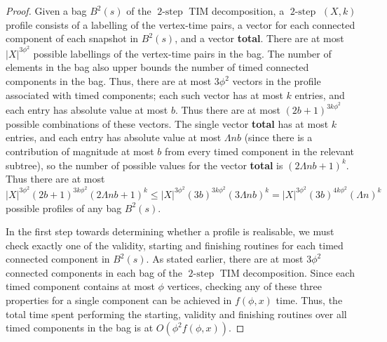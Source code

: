\documentclass[a4paper,UKenglish,cleveref, autoref, thm-restate]{lipics-v2021} %
\DeclareMathOperator{\twostep}{2-step}
\begin{document}
\begin{proof}
    Given a bag $B^2(s)$ of the $\twostep$ TIM decomposition, a $\twostep$ $(X,k)$ profile consists of a labelling of the vertex-time pairs, a vector for each connected component of each snapshot in $B^2(s)$, and a vector \textbf{total}. There are at most $|X|^{3\phi^2}$ possible labellings of the vertex-time pairs in the bag. The number of elements in the bag also upper bounds the number of timed connected components in the bag. Thus, there are at most $3\phi^2$ vectors in the profile associated with timed components; each such vector has at most $k$ entries, and each entry has absolute value at most $b$.  Thus there are at most $(2b+1)^{3k\phi^2}$ possible combinations of these vectors.  The single vector \textbf{total} has at most $k$ entries, and each entry has absolute value at most $\Lambda n b$ (since there is a contribution of magnitude at most $b$ from every timed component in the relevant subtree), so the number of possible values for the vector \textbf{total} is $(2 \Lambda n b + 1)^k$.  Thus there are at most $|X|^{3 \phi^2} (2b+1)^{3k\phi^2} (2 \Lambda n b + 1)^k\leq |X|^{3 \phi^2}(3b)^{3k \phi^2}(3 \Lambda n b)^k = |X|^{3 \phi^2} (3b)^{4 k \phi^2} (\Lambda n)^k$ possible profiles of any bag $B^2(s)$.


    
    
    In the first step towards determining whether a profile is realisable, we must check exactly one of the validity, starting and finishing routines for each timed connected component in $B^2(s)$.  As stated earlier, there are at most $3\phi^2$ connected components in each bag of the $\twostep$ TIM decomposition. %
    Since each timed component contains at most $\phi$ vertices, checking any of these three properties for a single component can be achieved in $f(\phi,x)$ time. Thus, the total time spent performing the starting, validity and finishing routines over all timed components in the bag is at $O(\phi^2 f(\phi,x))$.
    

\end{proof}
\end{document}
